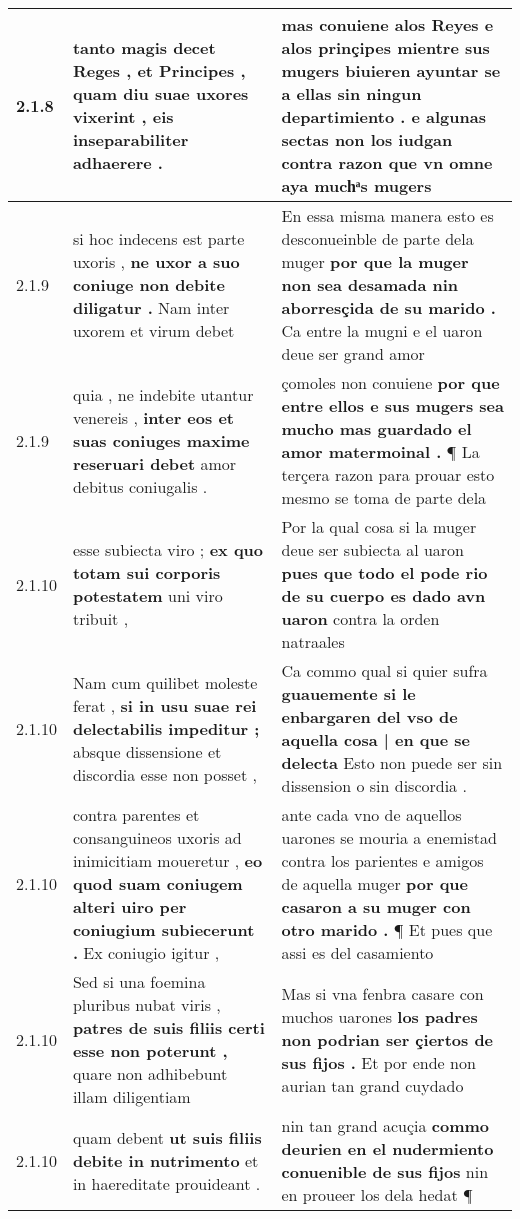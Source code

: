 \begin{tabular}{|p{1cm}|p{6.5cm}|p{6.5cm}|}
2.1.8 & tanto magis decet Reges , et Principes , \textbf{ quam diu suae uxores vixerint , } eis inseparabiliter adhaerere . & mas conuiene alos Reyes \textbf{ e alos prinçipes mientre sus mugers biuieren ayuntar se a ellas sin ningun departimiento . } e algunas sectas non los iudgan contra razon que vn omne aya muchͣs mugers \\\hline
2.1.9 & si hoc indecens est parte uxoris , \textbf{ ne uxor a suo coniuge non debite diligatur . } Nam inter uxorem et virum debet & En essa misma manera esto es desconueinble de parte dela muger \textbf{ por que la muger non sea desamada nin aborresçida de su marido . } Ca entre la mugni e el uaron deue ser grand amor \\\hline
2.1.9 & quia , ne indebite utantur venereis , \textbf{ inter eos et suas coniuges maxime reseruari debet } amor debitus coniugalis . & çomoles non conuiene \textbf{ por que entre ellos e sus mugers sea mucho mas guardado el amor matermoinal . } ¶ La terçera razon para prouar esto mesmo se toma de parte dela \\\hline
2.1.10 & esse subiecta viro ; \textbf{ ex quo totam sui corporis potestatem } uni viro tribuit , & Por la qual cosa si la muger deue ser subiecta al uaron \textbf{ pues que todo el pode rio de su cuerpo es dado avn uaron } contra la orden natraales \\\hline
2.1.10 & Nam cum quilibet moleste ferat , \textbf{ si in usu suae rei delectabilis impeditur ; } absque dissensione et discordia esse non posset , & Ca commo qual si quier sufra \textbf{ guauemente si le enbargaren del vso de aquella cosa | en que se delecta } Esto non puede ser sin dissension o sin discordia . \\\hline
2.1.10 & contra parentes et consanguineos uxoris ad inimicitiam moueretur , \textbf{ eo quod suam coniugem alteri uiro per coniugium subiecerunt . } Ex coniugio igitur , & ante cada vno de aquellos uarones se mouria a enemistad contra los parientes e amigos de aquella muger \textbf{ por que casaron a su muger con otro marido . } ¶ Et pues que assi es del casamiento \\\hline
2.1.10 & Sed si una foemina pluribus nubat viris , \textbf{ patres de suis filiis certi esse non poterunt , } quare non adhibebunt illam diligentiam & Mas si vna fenbra casare con muchos uarones \textbf{ los padres non podrian ser çiertos de sus fijos . } Et por ende non aurian tan grand cuydado \\\hline
2.1.10 & quam debent \textbf{ ut suis filiis debite in nutrimento } et in haereditate prouideant . & nin tan grand acuçia \textbf{ commo deurien en el nudermiento conuenible de sus fijos } nin en proueer los dela hedat ¶ \\\hline

\end{tabular}
